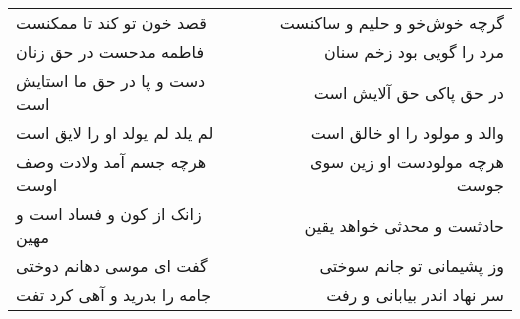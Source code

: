 \begin{center}
\begin{longtable}{l p{0.5cm} r}
قصد خون تو کند تا ممکنست
&&
گرچه خوش‌خو و حلیم و ساکنست
\\
فاطمه مدحست در حق زنان
&&
مرد را گویی بود زخم سنان
\\
دست و پا در حق ما استایش است
&&
در حق پاکی حق آلایش است
\\
لم یلد لم یولد او را لایق است
&&
والد و مولود را او خالق است
\\
هرچه جسم آمد ولادت وصف اوست
&&
هرچه مولودست او زین سوی جوست
\\
زانک از کون و فساد است و مهین
&&
حادثست و محدثی خواهد یقین
\\
گفت ای موسی دهانم دوختی
&&
وز پشیمانی تو جانم سوختی
\\
جامه را بدرید و آهی کرد تفت
&&
سر نهاد اندر بیابانی و رفت
\\
\end{longtable}
\end{center}
